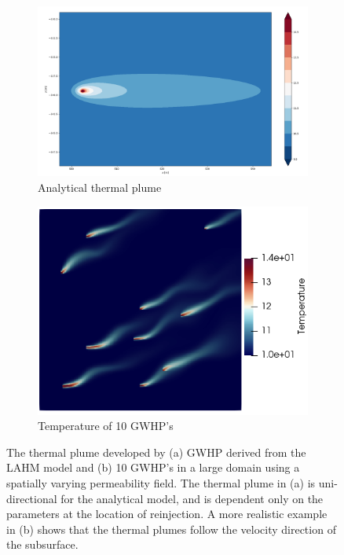 \documentclass{article} %
\begin{document}
\begin{figure}
\centering
\begin{subfigure}{.5\textwidth}
  \centering
  \includegraphics[width=.8\linewidth]{analyticalPlume.png}
  \caption{Analytical thermal plume}
  \label{analyticalPlume}
\end{subfigure}%
\begin{subfigure}{.5\textwidth}
  \centering
  \includegraphics[width=.8\linewidth]{large_temp_example_2.png}
  \caption{Temperature of 10 GWHP's}
  \label{large_example}
\end{subfigure}
\caption{The thermal plume developed by (a) GWHP derived from the LAHM model \cite{Pophillat2020} and (b) 10 GWHP's in a large domain using a spatially varying permeability field. The thermal plume in (a) is uni-directional for the analytical model, and is dependent only on the parameters at the location of reinjection. A more realistic example in (b) shows that the thermal plumes follow the velocity direction of the subsurface.}
\label{fig:test}
\end{figure}

\end{document}
